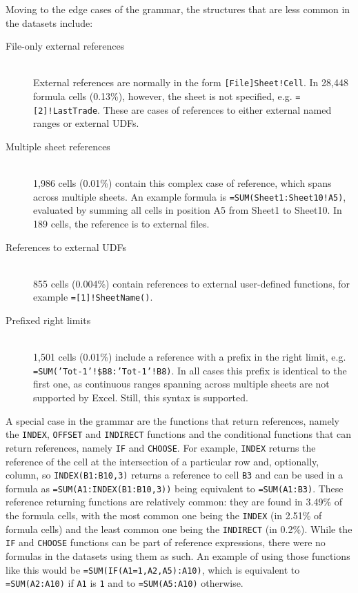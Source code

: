 \documentclass[conference]{IEEEtran}
\begin{document}
Moving to the edge cases of the grammar, the structures that are less common in the datasets include:
\begin{description}
	\item[File-only external references] \hfill \\
	External references are normally in the form \texttt{[File]Sheet!Cell}. In 28,448 formula cells (0.13\%), however, the sheet is not specified, e.g. \texttt{=[2]!LastTrade}. These are cases of references to either external named ranges or external UDFs.
	\item[Multiple sheet references] \hfill \\
	1,986 cells (0.01\%) contain this complex case of reference, which spans across multiple sheets. An example formula is \texttt{=SUM(Sheet1:Sheet10!A5)}, evaluated by summing all cells in position A5 from Sheet1 to Sheet10. In 189 cells, the reference is to external files.
	\item[References to external UDFs] \hfill \\
	855 cells (0.004\%) contain references to external user-defined functions, for example \texttt{=[1]!SheetName()}.
	\item[Prefixed right limits] \hfill \\
	1,501 cells (0.01\%) include a reference with a prefix in the right limit, e.g. \texttt{=SUM('Tot-1'!\$B8:'Tot-1'!B8)}. In all cases this prefix is identical to the first one, as continuous ranges spanning across multiple sheets are not supported by Excel. Still, this syntax is supported.
\end{description}

A special case in the grammar are the functions that return references, namely the \texttt{INDEX}, \texttt{OFFSET} and \texttt{INDIRECT} functions and the conditional functions that can return references, namely \texttt{IF} and \texttt{CHOOSE}.
For example, \texttt{INDEX} returns the reference of the cell at the intersection of a particular row and, optionally, column, so \texttt{INDEX(B1:B10,3)} returns a reference to cell \texttt{B3} and can be used in a formula as \texttt{=SUM(A1:INDEX(B1:B10,3))} being equivalent to \texttt{=SUM(A1:B3)}.
These reference returning functions are relatively common: they are found in 3.49\% of the formula cells, with the most common one being the \texttt{INDEX} (in 2.51\% of formula cells) and the least common one being the \texttt{INDIRECT} (in 0.2\%).
While the \texttt{IF} and \texttt{CHOOSE} functions can be part of reference expressions, there were no formulas in the datasets using them as such.
An example of using those functions like this would be \texttt{=SUM(IF(A1=1,A2,A5):A10)}, which is equivalent to \texttt{=SUM(A2:A10)} if \texttt{A1} is \texttt{1} and to \texttt{=SUM(A5:A10)} otherwise.
\end{document}
